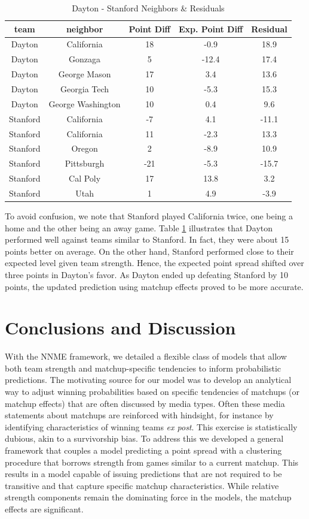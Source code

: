 \documentclass[letterpaper,12pt]{article}
\begin{document}
\begin{table}[h!]
\caption{Dayton - Stanford Neighbors \& Residuals}
\small
\centering
\begin{tabular}{|c|cccc |}
   \hline
   \hline
 team & neighbor &  Point Diff& Exp. Point Diff & Residual \\
  \hline
Dayton & California & 18 & -0.9 & 18.9\\
Dayton & Gonzaga & 5 & -12.4 & 17.4\\
Dayton & George Mason& 17 & 3.4 & 13.6\\
Dayton &  Georgia Tech& 10 & -5.3 & 15.3\\
Dayton & George Washington& 10 & 0.4 & 9.6\\
\hline
Stanford & California&-7 & 4.1&-11.1 \\
Stanford & California &11 &-2.3 &13.3 \\
Stanford & Oregon&2 &-8.9 &10.9 \\
Stanford & Pittsburgh&-21 &-5.3 &-15.7 \\
Stanford & Cal Poly&17 &13.8 &3.2 \\
Stanford & Utah&1 &4.9 &-3.9 \\
   \hline
   \hline
\end{tabular}
\label{tab:DayStan}
\end{table}

To avoid confusion, we note that Stanford played California twice, one being a home and the other being an away game.  Table \ref{tab:DayStan} illustrates that Dayton performed well against teams similar to Stanford. In fact, they were about 15 points better on average. On the other hand, Stanford performed close to their expected level given team strength. Hence, the expected point spread shifted over three points in Dayton's favor. As Dayton ended up defeating Stanford by 10 points, the updated prediction using matchup effects proved to be more accurate.

\section{Conclusions and Discussion}
With the NNME framework, we detailed a flexible class of models that allow both team strength and matchup-specific tendencies to inform probabilistic predictions. The motivating source for our model was to develop an analytical way to adjust winning probabilities based on specific tendencies of matchups (or matchup effects) that are often discussed by media types. Often these media statements about matchups are reinforced with hindsight, for instance by identifying characteristics of winning teams \emph{ex post}. This exercise is statistically dubious, akin to a survivorship bias. To address this we developed a general framework that couples a model predicting a point spread with a clustering procedure that borrows strength from games similar to a current matchup. This results in a model capable of issuing predictions that are not required to be transitive and that capture specific matchup characteristics. While relative strength components remain the dominating force in the models, the matchup effects are significant. 
\end{document}
